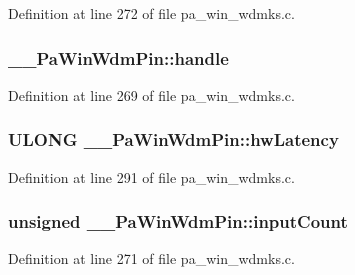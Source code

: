 Definition at line 272 of file pa\+\_\+win\+\_\+wdmks.\+c.

\subsubsection[{\texorpdfstring{handle}{handle}}]{ \+\_\+\+\_\+\+Pa\+Win\+Wdm\+Pin\+::handle}\hypertarget{struct_____pa_win_wdm_pin_a60e3d7a05346b1ce3e8e910e9d1c4fb8}{}\label{struct_____pa_win_wdm_pin_a60e3d7a05346b1ce3e8e910e9d1c4fb8}


Definition at line 269 of file pa\+\_\+win\+\_\+wdmks.\+c.

\subsubsection[{\texorpdfstring{hw\+Latency}{hwLatency}}]{\setlength{\rightskip}{0pt plus 5cm}U\+L\+O\+NG \+\_\+\+\_\+\+Pa\+Win\+Wdm\+Pin\+::hw\+Latency}\hypertarget{struct_____pa_win_wdm_pin_a2bef1e76e0d2a5184c48ee7cd6961573}{}\label{struct_____pa_win_wdm_pin_a2bef1e76e0d2a5184c48ee7cd6961573}


Definition at line 291 of file pa\+\_\+win\+\_\+wdmks.\+c.

\subsubsection[{\texorpdfstring{input\+Count}{inputCount}}]{\setlength{\rightskip}{0pt plus 5cm}unsigned \+\_\+\+\_\+\+Pa\+Win\+Wdm\+Pin\+::input\+Count}\hypertarget{struct_____pa_win_wdm_pin_a4e8be021efbd43cf14cb3b40e501d4eb}{}\label{struct_____pa_win_wdm_pin_a4e8be021efbd43cf14cb3b40e501d4eb}


Definition at line 271 of file pa\+\_\+win\+\_\+wdmks.\+c.


